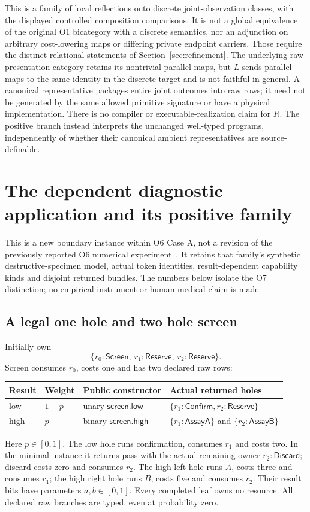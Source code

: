 \documentclass[11pt,a4paper]{article}
\theoremstyle{definition}
\begin{document}
This is a family of local reflections onto discrete joint-observation
classes, with the displayed controlled composition comparisons. It is
not a global equivalence of the original O1 bicategory with a discrete
semantics, nor an adjunction on arbitrary cost-lowering maps or differing
private endpoint carriers. Those require the distinct relational
statements of Section~\ref{sec:refinement}. The underlying raw presentation
category retains its nontrivial parallel maps, but $L$ sends parallel maps
to the same identity in the discrete target and is not faithful in general.
A canonical representative packages entire joint outcomes into raw rows;
it need not be generated by the same allowed primitive signature or have
a physical implementation. There is no compiler or executable-realization
claim for $R$. The positive branch instead interprets the unchanged
well-typed programs, independently of whether their canonical ambient
representatives are source-definable.

\section{The dependent diagnostic application and its positive family}
\label{sec:application}
This is a new boundary instance within O6 Case A, not a revision of the
previously reported O6 numerical experiment~\cite{O6}. It retains that
family's synthetic destructive-specimen model, actual token identities,
result-dependent capability kinds and disjoint returned bundles. The
numbers below isolate the O7 distinction; no empirical instrument or
human medical claim is made.

\subsection{A legal one hole and two hole screen}
Initially own
\[
 \{r_0:\mathsf{Screen},\ r_1:\mathsf{Reserve},\ r_2:\mathsf{Reserve}\}.
\]
Screen consumes $r_0$, costs one and has two declared raw rows:
\begin{center}
\begin{tabular}{@{}llll@{}}
\toprule
Result & Weight & Public constructor & Actual returned holes\\
\midrule
low & $1-p$ & unary $\mathsf{screen.low}$ &
$\{r_1:\mathsf{Confirm},r_2:\mathsf{Reserve}\}$\\
high & $p$ & binary $\mathsf{screen.high}$ &
$\{r_1:\mathsf{AssayA}\}$ and $\{r_2:\mathsf{AssayB}\}$\\
\bottomrule
\end{tabular}
\end{center}
Here $p\in[0,1]$. The low hole runs confirmation, consumes $r_1$ and
costs two. In the minimal instance it returns pass with the actual
remaining owner $r_2:\mathsf{Discard}$; discard costs zero and consumes
$r_2$. The high left hole runs $A$, costs three and consumes $r_1$; the
high right hole runs $B$, costs five and consumes $r_2$. Their result bits
have parameters $a,b\in[0,1]$. Every completed leaf owns no resource.
All declared raw branches are typed, even at probability zero.
\end{document}
